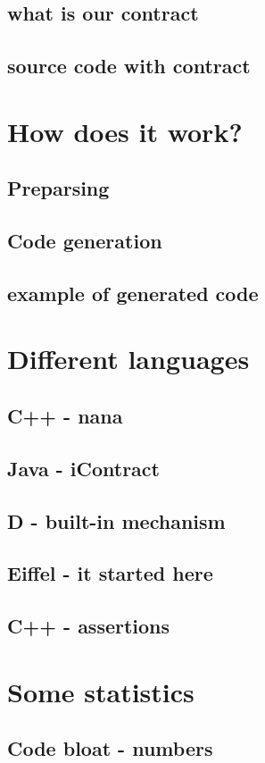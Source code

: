 \documentclass{beamer}
\begin{document}
\subsection{what is our contract}
\subsection{source code with contract}
\section{How does it work?}
\subsection{Preparsing}
\subsection{Code generation}
\subsection{example of generated code}
\section{Different languages}
\subsection{C++ - nana}
\subsection{Java - iContract}
\subsection{D - built-in mechanism}
\subsection{Eiffel - it started here}
\subsection{C++ - assertions}
\section{Some statistics}
\subsection{Code bloat - numbers}
\end{document}
